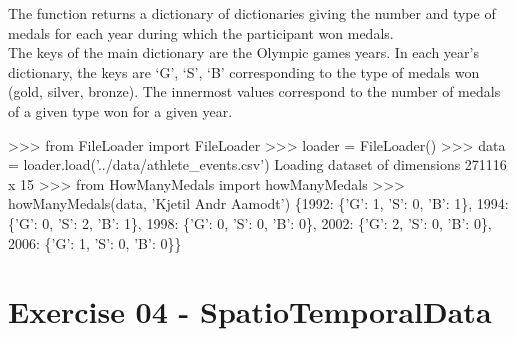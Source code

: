 \documentclass[]{article}
\newenvironment{Shaded}{\begin{snugshade}}{\end{snugshade}}
\newcommand{\DecValTok}[1]{\textcolor[rgb]{0.96,0.45,0.00}{#1}}
\newcommand{\ImportTok}[1]{\textcolor[rgb]{0.15,0.68,0.38}{#1}}
\newcommand{\NormalTok}[1]{\textcolor[rgb]{0.81,0.81,0.76}{#1}}
\newcommand{\OperatorTok}[1]{\textcolor[rgb]{0.81,0.81,0.76}{#1}}
\newcommand{\StringTok}[1]{\textcolor[rgb]{0.96,0.31,0.31}{#1}}
\begin{document}
The function returns a dictionary of dictionaries giving the number and
type of medals for each year during which the participant won medals.\\
The keys of the main dictionary are the Olympic games years. In each
year's dictionary, the keys are `G', `S', `B' corresponding to the type
of medals won (gold, silver, bronze). The innermost values correspond to
the number of medals of a given type won for a given year.

\begin{Shaded}
\begin{Highlighting}[]
\OperatorTok{>>>} \ImportTok{from}\NormalTok{ FileLoader }\ImportTok{import}\NormalTok{ FileLoader}
\OperatorTok{>>>}\NormalTok{ loader }\OperatorTok{=}\NormalTok{ FileLoader()}
\OperatorTok{>>>}\NormalTok{ data }\OperatorTok{=}\NormalTok{ loader.load(}\StringTok{'../data/athlete_events.csv'}\NormalTok{)}
\NormalTok{Loading dataset of dimensions }\DecValTok{271116}\NormalTok{ x }\DecValTok{15}
\OperatorTok{>>>} \ImportTok{from}\NormalTok{ HowManyMedals }\ImportTok{import}\NormalTok{ howManyMedals}
\OperatorTok{>>>}\NormalTok{ howManyMedals(data, }\StringTok{'Kjetil Andr Aamodt'}\NormalTok{)}
\NormalTok{\{}\DecValTok{1992}\NormalTok{: \{}\StringTok{'G'}\NormalTok{: }\DecValTok{1}\NormalTok{, }\StringTok{'S'}\NormalTok{: }\DecValTok{0}\NormalTok{, }\StringTok{'B'}\NormalTok{: }\DecValTok{1}\NormalTok{\}, }\DecValTok{1994}\NormalTok{: \{}\StringTok{'G'}\NormalTok{: }\DecValTok{0}\NormalTok{, }\StringTok{'S'}\NormalTok{: }\DecValTok{2}\NormalTok{, }\StringTok{'B'}\NormalTok{: }\DecValTok{1}\NormalTok{\}, }\DecValTok{1998}\NormalTok{: \{}\StringTok{'G'}\NormalTok{: }\DecValTok{0}\NormalTok{, }\StringTok{'S'}\NormalTok{: }\DecValTok{0}\NormalTok{, }\StringTok{'B'}\NormalTok{: }\DecValTok{0}\NormalTok{\}, }\DecValTok{2002}\NormalTok{: \{}\StringTok{'G'}\NormalTok{: }\DecValTok{2}\NormalTok{, }\StringTok{'S'}\NormalTok{: }\DecValTok{0}\NormalTok{, }\StringTok{'B'}\NormalTok{: }\DecValTok{0}\NormalTok{\}, }\DecValTok{2006}\NormalTok{: \{}\StringTok{'G'}\NormalTok{: }\DecValTok{1}\NormalTok{, }\StringTok{'S'}\NormalTok{: }\DecValTok{0}\NormalTok{, }\StringTok{'B'}\NormalTok{: }\DecValTok{0}\NormalTok{\}\}}
\end{Highlighting}
\end{Shaded}

\clearpage

\hypertarget{exercise-04---spatiotemporaldata-1}{%
\section{Exercise 04 -
SpatioTemporalData}\label{exercise-04---spatiotemporaldata-1}}
\end{document}
